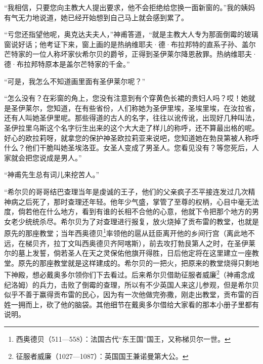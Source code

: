 \par “我相信，只要您向主教大人提出要求，他不会拒绝给您换一面新窗的。”我的姨妈有气无力地说道，她已经开始想到自己马上就会感到累了。
\par “亏您还指望他呢，奥克达夫夫人，”神甫答道，“就是主教大人专为那面倒霉的玻璃窗说好话；他考证下来，窗上画的是热纳维耶夫·德·布拉邦特的直系子孙、盖尔芒特家的一位人称坏家伙希尔贝的爵爷，正得到圣伊莱尔降恩赦罪。热纳维耶夫·德·布拉邦特原本是盖尔芒特家的千金。”
\par “可是，我怎么不知道画里面有圣伊莱尔呢？”
\par “怎么没有？在彩窗的角上，您没有注意到有个穿黄色长裙的贵妇人吗？哎！她就是圣伊莱尔，您知道，在有些省份，人们称她为圣伊里埃，圣埃里埃，在汝拉省，还有人叫她圣伊里呢。那些得道的古人的名字，往往以讹传讹，出现好几种叫法，圣伊拉里乌斯这个名字衍生出来的这个大大走了样儿的称呼，还不算最出格的呢。好心的欧拉莉呀，就拿您的保护神圣欧拉莉亚来说吧，您知道她在勃艮第被人称呼什么？他们干脆叫她圣埃洛亚。女圣人变成了男圣人。您看见没有？等您死后，人家就会把您说成是男人。”
\par “神甫先生总有词儿来挖苦人。”
\par “希尔贝的哥哥结巴查理当年是虔诚的王子，他们的父亲疯子丕平接连发过几次精神病之后死了，那时查理还年轻。他年少气盛，掌管了至尊的权柄，心目中毫无法度，倘若他在什么地方，看到有谁的长相不合他的心意，他就下令把那个地方的男女老少统统杀尽。希尔贝为了对查理进行报复，放火烧掉了贡布雷的教堂，也就是原先的那座教堂；当年西奥德贝\footnote{西奥德贝（511—558）：法国古代“东王国”国王，又称梯贝尔一世。}率领他的扈从廷臣离开他的乡间行宫（离此地不远，在梯贝齐，拉丁文叫西奥德贝齐阿喀斯），前去攻打勃艮第人之时，在圣伊莱尔的墓上发誓，倘若圣人在天之灵保佑他旗开得胜，日后他定将在这里建立一座教堂。原先的那座教堂就是这样建成的。希尔贝的一把火，把原来的教堂烧得只剩地下神殿，想必戴奥多尔领你们下去看过。后来希尔贝借助征服者威廉\footnote{征服者威廉（1027—1087）：英国国王兼诺曼第大公。}（神甫念成纪洛姆）的兵力，击败了倒霉的查理，所以有不少英国人来这儿参观，但是希尔贝似乎不善于赢得贡布雷的民心，因为有一次他做完弥撒，刚走出教堂，贡布雷的百姓一拥而上，砍了他的脑袋。其他细节在戴奥多尔借给大家看的那本小册子里都有说明。
